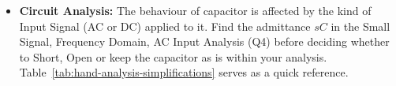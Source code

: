 \begin{itemize}
    A capacitor exists anywhere where you have two conductors
    separated by an insulator. The charges are stored on the
    surface of the conductors and the energy is stored in the
    electric field between the conductors.
  \item \textbf{Circuit Analysis:}
    The behaviour of capacitor is affected by the kind of Input Signal (AC
    or DC) applied to it. Find the admittance \(sC\) in the Small Signal,
    Frequency Domain, AC Input Analysis (Q4) before deciding whether to
    Short, Open or keep the capacitor as is within your analysis. Table~\ref{tab:hand-analysis-simplifications}
    serves as a quick reference.
\end{itemize}
